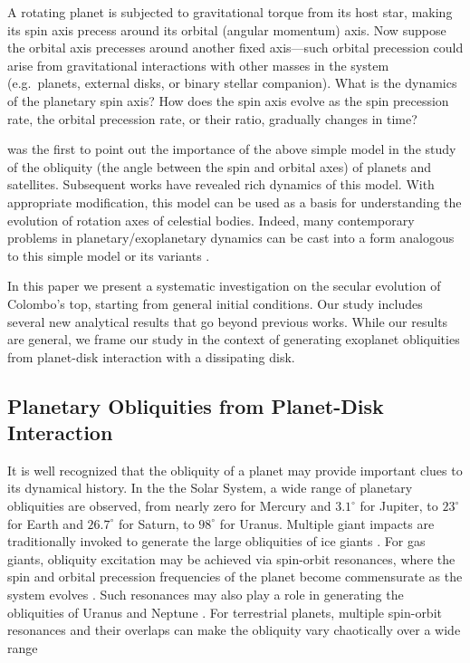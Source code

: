 \documentclass[twocolumn,twocolappendix]{aastex63}
\begin{document}
A rotating planet is subjected to gravitational torque from its host star,
making its spin axis precess around its orbital (angular momentum) axis.  Now
suppose the orbital axis precesses around another fixed axis---such orbital
precession could arise from gravitational interactions with other masses in the
system (e.g.\ planets, external disks, or binary stellar companion). What is the
dynamics of the planetary spin axis?  How does the spin axis evolve as the spin
precession rate, the orbital precession rate, or their ratio, gradually changes
in time?

\citet{colombo1966} was the first to point out the importance of the above
simple model in the study of the obliquity (the angle between the spin and
orbital axes) of planets and satellites. Subsequent works
\citep{peale1969,peale1974possible,ward1975tidal,henrard1987} have revealed rich
dynamics of this model. With appropriate modification, this model can be used as
a basis for understanding the evolution of rotation axes of celestial bodies.
Indeed, many contemporary problems in planetary/exoplanetary dynamics can be
cast into a form analogous to this simple model or its variants
\citep[e.g.][]{ward2004I, fabrycky_otides, batygin2013magnetic, lai2014star,
anderson2018teeter,zanazzi2018planet}.

In this paper we present a systematic investigation on the secular evolution of
Colombo's top, starting from general initial conditions. Our study includes
several new analytical results that go beyond previous works. While our results
are general, we frame our study in the context of generating exoplanet
obliquities from planet-disk interaction with a dissipating disk.

\subsection{Planetary Obliquities from Planet-Disk Interaction}

It is well recognized that the obliquity of a planet may provide important clues
to its dynamical history. In the the Solar System, a wide range of planetary
obliquities are observed, from nearly zero for Mercury and $3.1^\circ$ for
Jupiter, to $23^\circ$ for Earth and $26.7^\circ$ for Saturn, to $98^\circ$ for
Uranus. Multiple giant impacts are traditionally invoked to generate the large
obliquities of ice giants \citep{original_gi, benz1989tilting,
korycansky1990one, morbidelli_gi}. For gas giants, obliquity excitation may be
achieved via spin-orbit resonances, where the spin and orbital precession
frequencies of the planet become commensurate as the system evolves
\citep{ward2004I, ward2004II, vokrouhlicky2015tilting}. Such resonances may also
play a role in generating the obliquities of Uranus and Neptune
\citep{hamilton_tilting_ice}. For terrestrial planets, multiple spin-orbit
resonances and their overlaps can make the obliquity vary chaotically over a
wide range \citep[e.g.][]{laskar1993chaotic, touma1993chaotic, correia2003long}
\end{document}
